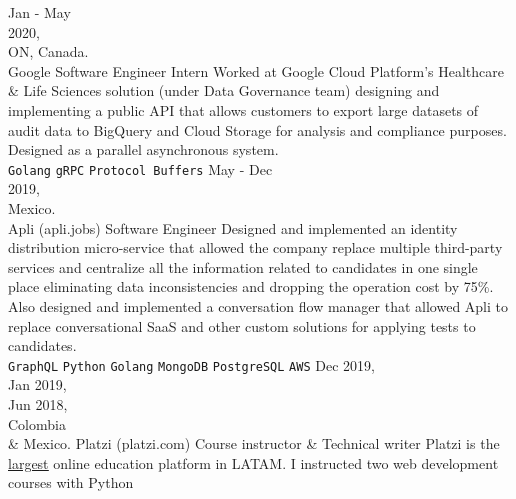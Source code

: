 \documentclass[9pt]{developercv}
\begin{document}
\begin{entrylist}
    \entry
        {
            Jan - May\\
            2020, \\
            ON, Canada.\\
        }
        {Google}
        {Software Engineer Intern}
        {
            Worked at Google Cloud Platform's Healthcare \& Life Sciences solution (under Data Governance team)
            designing and implementing a public API that allows customers to export large datasets
            of audit data to BigQuery and Cloud Storage for analysis and compliance purposes.
            Designed as a parallel asynchronous system.\\
                \texttt{Golang}\slashsep
                \texttt{gRPC}\slashsep
                \texttt{Protocol Buffers}
        }
    \entry
        {
            May - Dec\\
            2019, \\
            Mexico.\\
        }
        {Apli (apli.jobs)}
        {Software Engineer}
        {
            Designed and implemented an identity distribution micro-service that allowed the
            company replace multiple third-party services and centralize all the
            information related to candidates in one single place eliminating data
            inconsistencies and dropping the operation cost by 75\%. Also designed and implemented
            a conversation flow manager that allowed Apli to replace conversational SaaS and other
            custom solutions for applying tests to candidates.\\
                \texttt{GraphQL}\slashsep
                \texttt{Python}\slashsep
                \texttt{Golang}\slashsep
                \texttt{MongoDB}\slashsep
                \texttt{PostgreSQL}\slashsep
                \texttt{AWS}
        }
    \entry
        {
            Dec 2019,\\
            Jan 2019,\\
            Jun 2018,\\
            Colombia\\ \& Mexico.
        }
        {Platzi (platzi.com)}
        {Course instructor \& Technical writer}
        {
            Platzi is the {\href{https://thenextweb.com/insider/2015/03/23/how-platzi-bootstrapped-its-way-into-y-combinator-to-build-the-future-of-education/}{\underline{largest}}}
            online education platform in LATAM. I instructed two web development courses with Python
}
\end{entrylist}
\end{document}

